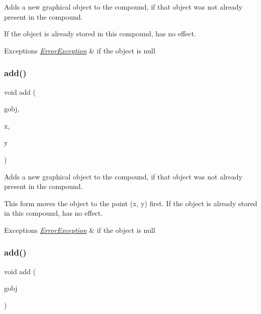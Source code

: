 Adds a new graphical object to the compound, if that object was not already present in the compound. 

If the object is already stored in this compound, has no effect. 
\begin{DoxyExceptions}{Exceptions}
{\em \mbox{\hyperlink{classErrorException}{Error\+Exception}}} & if the object is null \\
\hline
\end{DoxyExceptions}
\mbox{\label{classGCompound_a8bb36f245efc7806414a1339c2befa1c}} 
\subsubsection{\texorpdfstring{add()}{add()}\hspace{0.1cm}{\footnotesize\ttfamily [2/4]}}
{\footnotesize\ttfamily void add (\begin{DoxyParamCaption}\item[{\mbox{\hyperlink{classGObject}{G\+Object}} $\ast$}]{gobj,  }\item[{double}]{x,  }\item[{double}]{y }\end{DoxyParamCaption})\hspace{0.3cm}{\ttfamily [virtual]}}



Adds a new graphical object to the compound, if that object was not already present in the compound. 

This form moves the object to the point ({\ttfamily x}, {\ttfamily y}) first. If the object is already stored in this compound, has no effect. 
\begin{DoxyExceptions}{Exceptions}
{\em \mbox{\hyperlink{classErrorException}{Error\+Exception}}} & if the object is null \\
\hline
\end{DoxyExceptions}
\mbox{\label{classGCompound_ac732fc2123d7a6d7e2de145fe9bbd8e8}} 
\subsubsection{\texorpdfstring{add()}{add()}\hspace{0.1cm}{\footnotesize\ttfamily [3/4]}}
{\footnotesize\ttfamily void add (\begin{DoxyParamCaption}\item[{\mbox{\hyperlink{classGObject}{G\+Object}} \&}]{gobj }\end{DoxyParamCaption})\hspace{0.3cm}{\ttfamily [virtual]}}



